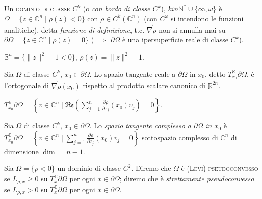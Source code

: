 \begin{defn}
  Un \textsc{dominio di classe $C^k$} (o \textit{con bordo di classe $C^k$}), $k in \mathbb{N}^*\cup\{\infty, \omega\}$ è $\Omega=\{z \in \mathbb{C}^n \mid \rho(z)<0\}$ con $\rho \in C^k(\mathbb{C}^n)$ (con $C^{\omega}$ si intendono le funzioni analitiche), detta \textit{funzione di definizione},
  t.c. $\vec{\nabla}\rho$ non si annulla mai su $\partial\Omega=\{z \in \mathbb{C}^n \mid \rho(z)=0\}$ ($\implies$ $\partial\Omega$ è una ipersuperficie reale di classe $C^k$).
\end{defn}

\begin{ex}
  $\mathbb{B}^n=\{\|z\|^2-1<0\}$, $\rho(z)=\|z\|^2-1$.
\end{ex}

\begin{oss}
  Sia $\Omega$ di classe $C^k$, $x_0 \in \partial\Omega$. Lo spazio tangente reale a $\partial\Omega$ in $x_0$, detto $T_{x_0}^{\mathbb{R}}\partial\Omega$, è l'ortogonale di $\vec{\nabla}\rho(x_0)$ rispetto al prodotto scalare canonico di $\mathbb{R}^{2n}$.
\end{oss}

\begin{exc}
  $\displaystyle T_{x_0}^{\mathbb{R}}\partial\Omega=\left\{v \in \mathbb{C}^n \mid \mathfrak{Re}\left(\sum_{j=1}^n \frac{\partial\rho}{\partial z_j}(x_0)v_j\right)=0\right\}$.
\end{exc}

\begin{defn}
  Sia $\Omega$ di classe $C^k$, $x_0 \in \partial\Omega$. Lo \textit{spazio tangente complesso a $\partial\Omega$ in $x_0$} è $\displaystyle T_{x_0}^{\mathbb{C}}\partial\Omega=\left\{v \in \mathbb{C}^n \mid \sum_{j=1}^n \frac{\partial\rho}{\partial z_j}(x_0)v_j=0\right\}$ sottospazio complesso di $\mathbb{C}^n$ di dimensione $\dim=n-1$.
\end{defn}

\begin{defn}
  Sia $\Omega=\{\rho<0\}$ un dominio di classe $C^2$. Diremo che $\Omega$ è \textsc{(Levi) pseudoconvesso} se $L_{\rho,x} \ge 0$ su $T_x^{\mathbb{C}}\partial\Omega$ per ogni $x \in \partial\Omega$; diremo che è \textit{strettamente pseudoconvesso} se $L_{\rho,x} > 0$ su $T_x^{\mathbb{C}}\partial\Omega$ per ogni $x \in \partial\Omega$.
\end{defn}

